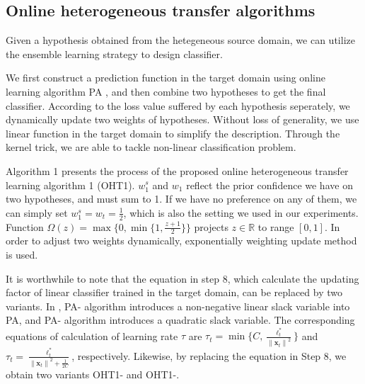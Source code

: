 \documentclass{article} %
\theoremstyle{remark}
\theoremstyle{definition}
\begin{document}
\subsection{Online heterogeneous transfer algorithms}

Given a hypothesis obtained from the hetegeneous source domain, we can utilize the ensemble learning strategy to design classifier.

We first construct a prediction function in the target domain using online learning algorithm PA \cite{2006onlineCrammer}, and then combine two hypotheses to get the final classifier.
According to the loss value suffered by each hypothesis seperately, we dynamically update two weights of hypotheses.
Without loss of generality, we use linear function in the target domain to simplify the description.
Through the kernel trick, we are able to tackle non-linear classification problem.

Algorithm 1 presents the process of the proposed online heterogeneous transfer learning algorithm 1 (OHT1).
$w_{1}^{s}$ and $w_1$ reflect the prior confidence we have on two hypotheses, and must sum to 1.
If we have no preference on any of them, we can simply set $w_{1}^{s} = w_{t} = \frac{1}{2}$, which is also the setting we used in our experiments.
Function $\varOmega(z) = \max \{ 0, \min \{ 1, \frac{z+1}{2} \}\}$ projects $z \in \mathbb{R}$ to range $[0,1]$.
In order to adjust two weights dynamically, exponentially weighting update method \cite{2006predictionCesa} is used.

It is worthwhile to note that the equation in step 8, which calculate the updating factor of linear classifier trained in the target domain, can be replaced by two variants.
In \cite{2006onlineCrammer}, PA-\uppercase\expandafter{} algorithm introduces a non-negative linear slack variable into PA, and PA-\uppercase\expandafter{} algorithm introduces a quadratic slack variable.
The corresponding equations of calculation of learning rate $\tau$ are $\tau_t = \min \{ C, \frac{\ell_{t}^{*}}{{\|\mathbf{x}_t\|}^2} \} $ and $ \tau_t = \frac{\ell_{t}^{*}}{{\|\mathbf{x}_t\|}^2 + \frac{1}{2C}} $, respectively.
Likewise, by replacing the equation in Step 8, we obtain two variants OHT1-\uppercase\expandafter{} and OHT1-\uppercase\expandafter{}.
\end{document}
